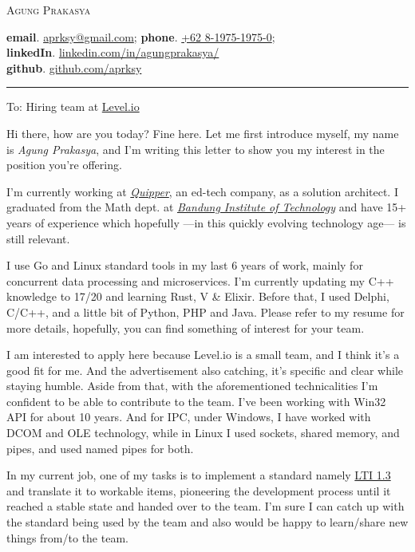 \documentclass[12pt]{res} %
\begin{document}
\begin{center}
	\textsc{Agung Prakasya}

	\textbf{{\scriptsize email}}. \href{mailto:aprksy@gmail.com}{aprksy@gmail.com}; 
	\textbf{{\scriptsize phone}}. \href{https://wa.me/628197519750}{+62 8-1975-1975-0};\\ 
	\textbf{{\scriptsize linkedIn}}. \href{https://www.linkedin.com/in/agungprakasya/}{linkedin.com/in/agungprakasya/}\\ 
	\textbf{{\scriptsize github}}. \href{https://github.com/aprksy}{github.com/aprksy}
\end{center}


\vspace{-20pt}
\begin{center}
	\rule{0.5\textwidth}{1pt}
\end{center}

To: Hiring team
at \href{https://level.io/}{Level.io}

Hi there, how are you today? Fine here.
Let me first introduce myself, my name is \textit{Agung Prakasya}, and I’m writing this letter to
show you my interest in the position you’re offering.

I’m currently working at \href{https://www.quipper.com}{\textit{Quipper}}, an ed-tech company, as a solution architect. I graduated
from the Math dept. at \href{https://www.itb.ac.id}{\textit{Bandung Institute of Technology}} and have 15+ years of experience
which hopefully —in this quickly evolving technology age— is still relevant.

I use Go and Linux standard tools in my last 6 years of work, mainly for concurrent data
processing and microservices. I’m currently updating my C++ knowledge to 17/20 and
learning Rust, V \& Elixir. Before that, I used Delphi, C/C++, and a little bit of Python,
PHP and Java. Please refer to my resume for more details, hopefully, you can find something
of interest for your team.

I am interested to apply here because Level.io is a small team, and I think it’s a good fit for
me. And the advertisement also catching, it’s specific and clear while staying humble. Aside
from that, with the aforementioned technicalities I’m confident to be able to contribute to the
team. I’ve been working with Win32 API for about 10 years. And for IPC, under Windows, I
have worked with DCOM and OLE technology, while in Linux I used sockets, shared memory, and pipes, and used named pipes for both.

In my current job, one of my tasks is to implement a standard namely \href{https://www.imsglobal.org/spec/lti/v1p3}{LTI 1.3} and translate it
to workable items, pioneering the development process until it reached a stable state and
handed over to the team. I’m sure I can catch up with the standard being used by the team
and also would be happy to learn/share new things from/to the team.
\end{document}
